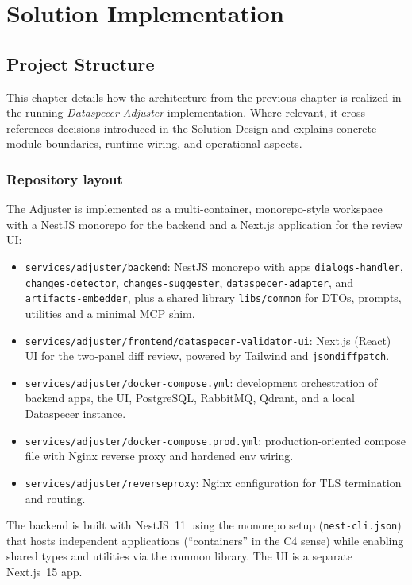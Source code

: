 \chapter{Solution Implementation}

\section{Project Structure}
This chapter details how the architecture from the previous chapter is realized in
the running \textit{Dataspecer Adjuster} implementation. Where relevant, it
cross-references decisions introduced in the Solution Design and explains concrete
module boundaries, runtime wiring, and operational aspects.

\subsection*{Repository layout}
The Adjuster is implemented as a multi-container, monorepo-style workspace with a
NestJS monorepo for the backend and a Next.js application for the review UI:
\begin{itemize}
  \item \texttt{services/adjuster/backend}: NestJS monorepo with apps
  \texttt{dialogs-handler}, \texttt{changes-detector}, \texttt{changes-suggester},
  \texttt{dataspecer-adapter}, and \texttt{artifacts-embedder}, plus a shared library
  \texttt{libs/common} for DTOs, prompts, utilities and a minimal MCP shim.
  \item \texttt{services/adjuster/frontend/dataspecer-validator-ui}: Next.js (React) UI for
  the two-panel diff review, powered by Tailwind and \texttt{jsondiffpatch}.
  \item \texttt{services/adjuster/docker-compose.yml}: development orchestration of backend
  apps, the UI, PostgreSQL, RabbitMQ, Qdrant, and a local Dataspecer instance.
  \item \texttt{services/adjuster/docker-compose.prod.yml}: production-oriented compose file
  with Nginx reverse proxy and hardened env wiring.
  \item \texttt{services/adjuster/reverseproxy}: Nginx configuration for TLS termination and routing.
\end{itemize}

The backend is built with NestJS~11 using the monorepo setup (\texttt{nest-cli.json})
that hosts independent applications (``containers'' in the C4 sense) while enabling
shared types and utilities via the common library. The UI is a separate Next.js~15 app.

